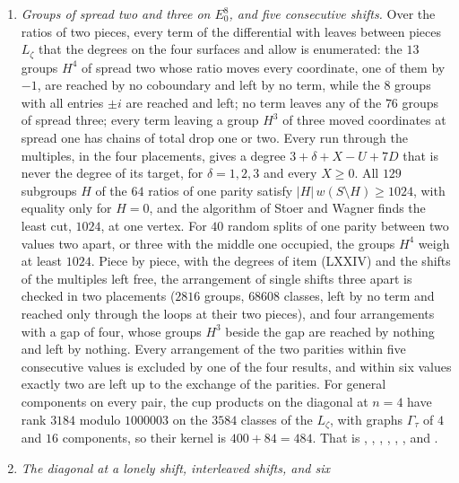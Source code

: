 \begin{enumerate}[label=\textup{(\Roman*)},leftmargin=*]
  ; the paper proves the base of the induction by
  hand ( and the transvection of two points), so the
  $38$ cases with $n=3,4$ are not used.
\item \emph{Groups of spread two and three on $E_0^8$, and five consecutive
  shifts.} Over the ratios of two pieces, every term of the differential with
  leaves between pieces $L_{\zeta}$ that the degrees on the four surfaces and
   allow is enumerated: the $13$ groups $H^{4}$ of
  spread two whose ratio moves every coordinate, one of them by $-1$, are
  reached by no coboundary and left by no term, while the $8$ groups with all
  entries $\pm i$ are reached and left; no term leaves any of the $76$ groups
  of spread three; every term leaving a group $H^{3}$ of three moved
  coordinates at spread one has chains of total drop one or two. Every run
  through the multiples, in the four placements, gives a degree
  $3+\delta+X-U+7D$ that is never the degree of its target, for $\delta=1,2,3$
  and every $X\ge0$. All $129$ subgroups $H$ of the $64$ ratios of one parity
  satisfy $|H|\,w(S\setminus H)\ge1024$, with equality only for $H=0$, and
  the algorithm of Stoer and Wagner finds the least cut, $1024$, at one
  vertex. For $40$ random splits of one parity between two values two apart,
  or three with the middle one occupied, the groups $H^{4}$ weigh at least
  $1024$. Piece by piece, with the degrees of item (LXXIV) and the shifts of
  the multiples left free, the arrangement of single shifts three apart is
  checked in two placements ($2816$ groups, $68608$ classes, left by no term
  and reached only through the loops at their two pieces), and four
  arrangements with a gap of four, whose groups $H^{3}$ beside the gap are
  reached by nothing and left by nothing. Every arrangement of the two
  parities within five consecutive values is excluded by one of the four
  results, and within six values exactly two are left up to the exchange of
  the parities. For general components on every pair, the cup products on
  the diagonal at $n=4$ have rank $3184$ modulo $1000003$ on the $3584$
  classes of the $L_{\zeta}$, with graphs $\Gamma_{\tau}$ of $4$ and $16$
  components, so their kernel is $400+84=484$. That is
  , , ,
  , , ,
   and .
\item \emph{The diagonal at a lonely shift, interleaved shifts, and six
}
\end{enumerate}
